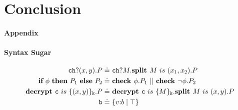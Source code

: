 \documentclass[master,english]{kuisthesis}
\theoremstyle{definition}
\begin{document}
\section{Conclusion}\label{sec-structure}

\paragraph{Appendix}
\paragraph{Syntax Sugar}

\begin{align*}
    \Code{ch}?(x, y).P \doteq&\ \Code{ch}?M.\splitP{M}{x_1}{x_2}.P
    \\\iteP{\phi}{P_1}{P_2} \doteq&\ \checkP{\phi}.P_1 ~||~ \checkP{\neg \phi}.P_2
    \\\decryptP{\Code{c}}{(x, y)}{\Code{k}}.P \doteq&\ \decryptP{\Code{c}}{M}{\Code{k}}.\splitP{M}{x}{y}.P
    \\\Code{b} \doteq& \ \rawnuot{b}{\top}
\end{align*}

 
\end{document}
